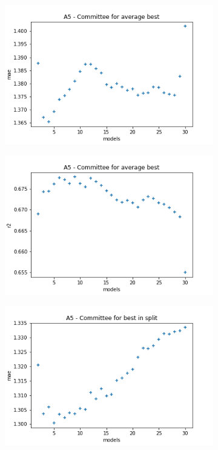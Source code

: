 \begin{figure}
     \centering
     \begin{subfigure}[b]{0.49\textwidth}
         \centering
         \includegraphics[width=\textwidth]{images/A5_avg_mae.png}
         \caption{}
         \label{fig:ea-avg-mae-a5}
     \end{subfigure}
     \begin{subfigure}[b]{0.49\textwidth}
         \centering
         \includegraphics[width=\textwidth]{images/A5_avg_r2.png}
         \caption{}
         \label{fig:ea-avg-r2-a5}
     \end{subfigure}
     \hfill
     \begin{subfigure}[b]{0.49\textwidth}
         \centering
         \includegraphics[width=\textwidth]{images/A5_split_mae.png}

\end{subfigure}
\end{figure}
